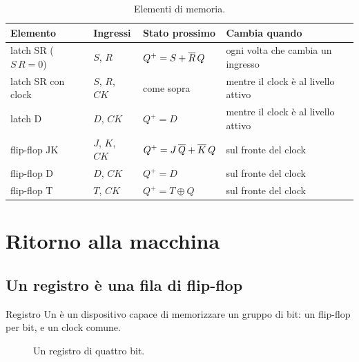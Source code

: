 \begin{table}[htb]
\centering\small
\caption{Elementi di memoria.}\label{tab:seq:summary}
\begin{tabular}{@{}llll@{}}
\toprule
\textbf{Elemento} & \textbf{Ingressi} & \textbf{Stato prossimo} & \textbf{Cambia quando}\\
\midrule
latch SR ($S\,R=0$) & $S$, $R$ & $Q^{+}=S+\overline{R}\,Q$ & ogni volta che cambia un ingresso\\
latch SR con clock & $S$, $R$, $CK$ & come sopra & mentre il clock è al livello attivo\\
latch D & $D$, $CK$ & $Q^{+}=D$ & mentre il clock è al livello attivo\\
flip-flop JK & $J$, $K$, $CK$ & $Q^{+}=J\,\overline{Q}+\overline{K}\,Q$ & sul fronte del clock\\
flip-flop D & $D$, $CK$ & $Q^{+}=D$ & sul fronte del clock\\
flip-flop T & $T$, $CK$ & $Q^{+}=T\oplus Q$ & sul fronte del clock\\
\bottomrule
\end{tabular}
\end{table}

\section{Ritorno alla macchina}

\subsection{Un registro è una fila di flip-flop}

\begin{definition}{Registro}
Un  è un dispositivo capace di memorizzare un gruppo di bit: un
flip-flop per bit, e un clock comune.
\end{definition}

\begin{figure}[htb]
\centering
{}
\caption{Un registro di quattro bit.}
\label{fig:seq:reg}
\end{figure}


